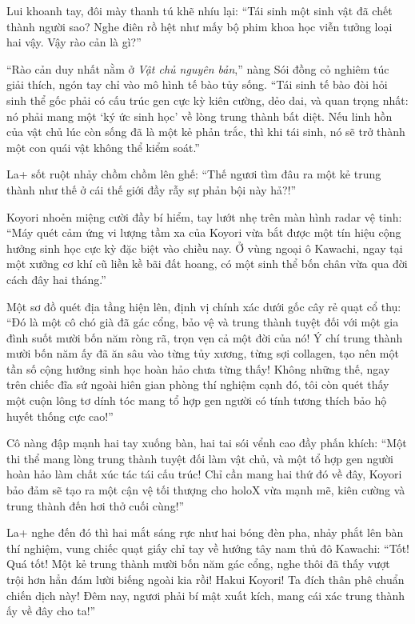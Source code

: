 \documentclass[../main.tex]{subfiles}
\begin{document}
Lui khoanh tay, đôi mày thanh tú khẽ nhíu lại: ``Tái sinh một sinh vật đã chết thành người sao? Nghe điên rồ hệt như mấy bộ phim khoa học viễn tưởng loại hai vậy. Vậy rào cản là gì?''

``Rào cản duy nhất nằm ở \textit{Vật chủ nguyên bản},'' nàng Sói đồng cỏ nghiêm túc giải thích, ngón tay chỉ vào mô hình tế bào tủy sống. ``Tái sinh tế bào đòi hỏi sinh thể gốc phải có cấu trúc gen cực kỳ kiên cường, dẻo dai, và quan trọng nhất: nó phải mang một `ký ức sinh học' về lòng trung thành bất diệt. Nếu linh hồn của vật chủ lúc còn sống đã là một kẻ phản trắc, thì khi tái sinh, nó sẽ trở thành một con quái vật không thể kiểm soát.''

La+ sốt ruột nhảy chồm chồm lên ghế: ``Thế ngươi tìm đâu ra một kẻ trung thành như thế ở cái thế giới đầy rẫy sự phản bội này hả?!''

Koyori nhoẻn miệng cười đầy bí hiểm, tay lướt nhẹ trên màn hình radar vệ tinh: ``Máy quét cảm ứng vi lượng tầm xa của Koyori vừa bắt được một tín hiệu cộng hưởng sinh học cực kỳ đặc biệt vào chiều nay. Ở vùng ngoại ô Kawachi, ngay tại một xưởng cơ khí cũ liền kề bãi đất hoang, có một sinh thể bốn chân vừa qua đời cách đây hai tháng.''

Một sơ đồ quét địa tầng hiện lên, định vị chính xác dưới gốc cây rẻ quạt cổ thụ: ``Đó là một cô chó già đã gác cổng, bảo vệ và trung thành tuyệt đối với một gia đình suốt mười bốn năm ròng rã, trọn vẹn cả một đời của nó! Ý chí trung thành mười bốn năm ấy đã ăn sâu vào từng tủy xương, từng sợi collagen, tạo nên một tần số cộng hưởng sinh học hoàn hảo chưa từng thấy! Không những thế, ngay trên chiếc đĩa sứ ngoài hiên gian phòng thí nghiệm cạnh đó, tôi còn quét thấy một cuộn lông tơ dính tóc mang tổ hợp gen người có tính tương thích bảo hộ huyết thống cực cao!''

Cô nàng đập mạnh hai tay xuống bàn, hai tai sói vểnh cao đầy phấn khích: ``Một thi thể mang lòng trung thành tuyệt đối làm vật chủ, và một tổ hợp gen người hoàn hảo làm chất xúc tác tái cấu trúc! Chỉ cần mang hai thứ đó về đây, Koyori bảo đảm sẽ tạo ra một cận vệ tối thượng cho holoX vừa mạnh mẽ, kiên cường và trung thành đến hơi thở cuối cùng!''

La+ nghe đến đó thì hai mắt sáng rực như hai bóng đèn pha, nhảy phắt lên bàn thí nghiệm, vung chiếc quạt giấy chỉ tay về hướng tây nam thủ đô Kawachi: ``Tốt! Quá tốt! Một kẻ trung thành mười bốn năm gác cổng, nghe thôi đã thấy vượt trội hơn hẳn đám lười biếng ngoài kia rồi! Hakui Koyori! Ta đích thân phê chuẩn chiến dịch này! Đêm nay, ngươi phải bí mật xuất kích, mang cái xác trung thành ấy về đây cho ta!''
\end{document}
